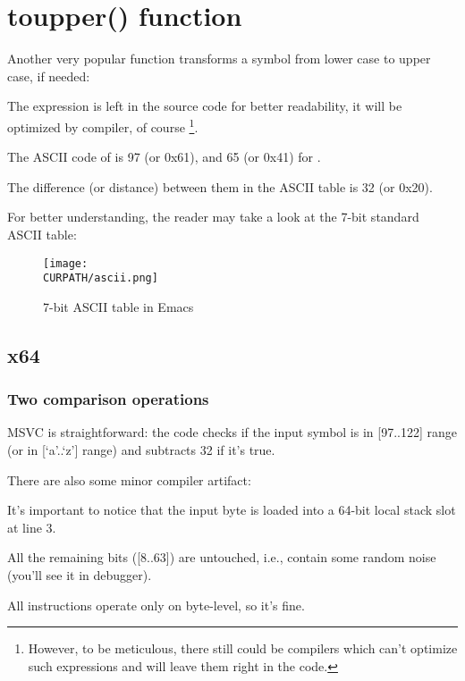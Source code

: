 \section{toupper() function}

Another very popular function transforms a symbol from lower case to upper case, if needed:



The  expression is left in the source code for better readability, it will be 
optimized by compiler, of course
\footnote{However, to be meticulous, there still could be compilers which can't optimize such expressions
and will leave them right in the code.}.

The \ac{ASCII} code of  is 97 (or 0x61), and 65 (or 0x41) for .

The difference (or distance) between them in the \ac{ASCII} table is 32 (or 0x20).

For better understanding, the reader may take a look at the 7-bit standard \ac{ASCII} table:

\begin{figure}[H]
\centering
\texttt{[image: \\CURPATH/ascii.png]}
\caption{7-bit \ac{ASCII} table in Emacs}
\end{figure}

\subsection{x64}

\subsubsection{Two comparison operations}

\NonOptimizing MSVC is straightforward: the code checks if the input symbol is in [97..122] range 
(or in [`a'..`z'] range) and subtracts 32 if it's true.

There are also some minor compiler artifact:



It's important to notice that the input byte is loaded into a 64-bit local stack slot at line 3.

All the remaining bits ([8..63]) are untouched, i.e., contain some random noise (you'll see it in debugger).

All instructions operate only on byte-level, so it's fine.

